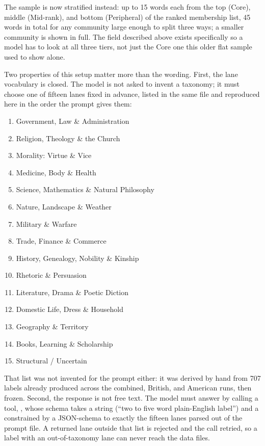 \documentclass[11pt]{article}
\begin{document}
The sample is now stratified instead: up to
15 words each from the top (Core), middle (Mid-rank), and bottom
(Peripheral) of the ranked membership list, 45 words in total for any
community large enough to split three ways; a smaller community is
shown in full. The  field described above exists
specifically so a model has to look at all three tiers, not just the
Core one this older flat sample used to show alone.

Two properties of this setup matter more than the wording. First, the
lane vocabulary is closed. The model is not asked to invent a taxonomy;
it must choose one of fifteen lanes fixed in advance, listed in the same
file and reproduced here in the order the prompt gives them:

\begin{dobox}
\begin{enumerate}[itemsep=0.15em,label=\arabic*.]
  \item Government, Law \& Administration
  \item Religion, Theology \& the Church
  \item Morality: Virtue \& Vice
  \item Medicine, Body \& Health
  \item Science, Mathematics \& Natural Philosophy
  \item Nature, Landscape \& Weather
  \item Military \& Warfare
  \item Trade, Finance \& Commerce
  \item History, Genealogy, Nobility \& Kinship
  \item Rhetoric \& Persuasion
  \item Literature, Drama \& Poetic Diction
  \item Domestic Life, Dress \& Household
  \item Geography \& Territory
  \item Books, Learning \& Scholarship
  \item Structural / Uncertain
\end{enumerate}
\end{dobox}

That list was not invented for the prompt either: it was derived by hand
from 707 labels already produced across the combined, British, and
American runs, then frozen. Second, the response is not free text. The
model must answer by calling a tool, , whose schema
takes a  string (``two to five word plain-English label'')
and a  constrained by a JSON-schema  to exactly the
fifteen lanes parsed out of the prompt file. A returned lane outside that
list is rejected and the call retried, so a label with an out-of-taxonomy
lane can never reach the data files.
\end{document}
